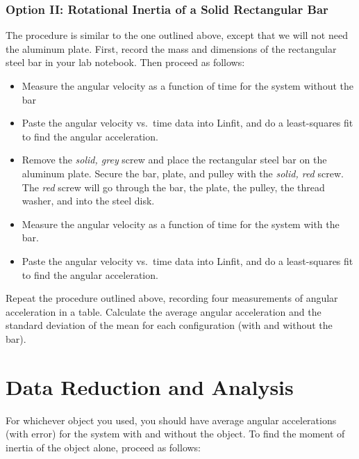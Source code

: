 \subsubsection*{Option II: Rotational Inertia of a Solid Rectangular
Bar} The procedure is similar to the one outlined above, except that
we will not need the aluminum plate.  First, record the
mass and dimensions of the rectangular steel bar in your lab notebook.
Then proceed as follows:

\begin{itemize}
\item Measure the angular velocity as a function of time for the system without the bar
\item Paste the angular velocity vs.\ time data into Linfit, and do a
least-squares fit to find the angular acceleration.

\item[] Remove the  {\em solid, grey} screw and place the
rectangular steel bar on the aluminum plate.  Secure the bar, plate, and pulley
with the {\em solid, red}
screw.  The {\em red} screw will go through the bar, the plate, the pulley, the
thread
washer, and into the steel disk.

\item Measure the angular velocity as a function of time for the system
with the bar.


\item Paste the angular velocity vs.\ time data into Linfit, and do a
least-squares fit to find the angular acceleration.
\end{itemize}

Repeat the procedure outlined above, recording
four measurements of angular acceleration in a table.  Calculate the
average angular acceleration and the standard deviation of the mean
for each configuration (with and without the bar).

\section*{Data Reduction and Analysis}

For whichever object you used, you should have average angular
accelerations (with error) for the system with
and without the object.  To find the moment of inertia of the object
alone, proceed as follows:

